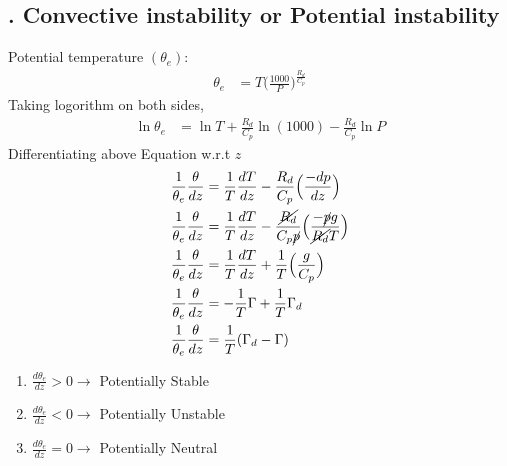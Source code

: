 \documentclass[fleqn,10pt]{SelfArx} %
\begin{document}
\newpage
\subsection{. Convective instability or Potential instability}
Potential temperature $(\theta_e)$:
\begin{align}
    \theta_e &= T\Big(\frac{1000}{P}\Big)^{\frac{R_d}{C_p}}
\end{align}
Taking logorithm on both sides,
\begin{align}
    \ln{\theta_e} &= \ln{T} + {\frac{R_d}{C_p}}\ln{(1000)} - {\frac{R_d}{C_p}}\ln{P}
\end{align}
Differentiating above Equation w.r.t $z$
\begin{align}
    \frac{1}{\theta_e}\frac{\theta}{dz} &= \frac{1}{T}\frac{dT}{dz} - \frac{R_d}{C_p}\Big(\frac{-dp}{dz}\Big) \\
    \frac{1}{\theta_e}\frac{\theta}{dz} &= \frac{1}{T}\frac{dT}{dz} - \frac{\cancel{R_d}}{C_p \cancel{p}}\Big(\frac{-\cancel{p}g}{\cancel{R_d}T}\Big) \\
    \frac{1}{\theta_e}\frac{\theta}{dz} &= \frac{1}{T}\frac{dT}{dz} + \frac{1}{T}\Big(\frac{g}{C_p}\Big) \\
    \frac{1}{\theta_e}\frac{\theta}{dz} &= -\frac{1}{T}\Gamma + \frac{1}{T}\Gamma_d \\
    \frac{1}{\theta_e}\frac{\theta}{dz} &= \frac{1}{T}(\Gamma_d - \Gamma)
\end{align}

\begin{enumerate}[noitemsep]
    \item $\frac{d\theta_e}{dz} > 0 \rightarrow $ Potentially Stable
    \item $\frac{d\theta_e}{dz} < 0 \rightarrow $ Potentially Unstable
    \item $\frac{d\theta_e}{dz} = 0 \rightarrow $ Potentially Neutral
\end{enumerate}
\end{document}
